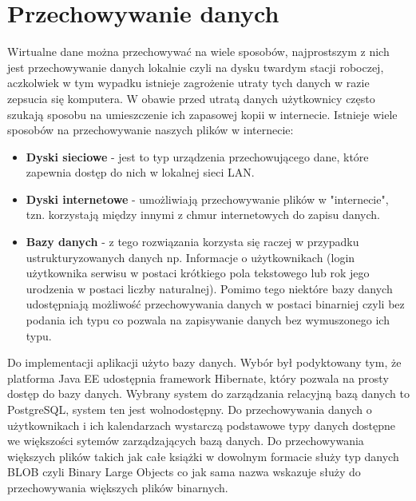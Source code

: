 \section{Przechowywanie danych}
\label{sec:bazadanych}
Wirtualne dane można przechowywać na wiele sposobów, najprostszym z nich jest przechowywanie danych lokalnie czyli na dysku twardym stacji roboczej, aczkolwiek w tym wypadku istnieje zagrożenie utraty tych danych w razie zepsucia się komputera. W obawie przed utratą danych użytkownicy często szukają sposobu na umieszczenie ich zapasowej kopii w internecie. Istnieje wiele sposobów na przechowywanie naszych plików w internecie:
\begin{itemize}
	\item \textbf{Dyski sieciowe} - jest to typ urządzenia przechowującego dane, które zapewnia dostęp do nich w lokalnej sieci LAN.
	\item \textbf{Dyski internetowe} - umożliwiają przechowywanie plików w "internecie", tzn. korzystają między innymi z chmur internetowych do zapisu danych. 
	\item \textbf{Bazy danych} - z tego rozwiązania korzysta się raczej w przypadku ustrukturyzowanych danych np. Informacje o użytkownikach (login użytkownika serwisu w postaci krótkiego pola tekstowego lub rok jego urodzenia w postaci liczby naturalnej). Pomimo tego niektóre bazy danych udostępniają możliwość przechowywania danych w postaci binarniej czyli bez podania ich typu co pozwala na zapisywanie danych bez wymuszonego ich typu.  
\end{itemize}

Do implementacji aplikacji użyto bazy danych. Wybór był podyktowany tym, że platforma Java EE udostępnia framework Hibernate, który pozwala na prosty dostęp do bazy danych. Wybrany system do zarządzania relacyjną bazą danych to PostgreSQL, system ten jest wolnodostępny. Do przechowywania danych o użytkownikach i ich kalendarzach wystarczą podstawowe typy danych dostępne we większości sytemów zarządzających bazą danych. Do przechowywania większych plików takich jak całe książki w dowolnym formacie służy typ danych BLOB czyli Binary Large Objects co jak sama nazwa wskazuje służy do przechowywania większych plików binarnych.
